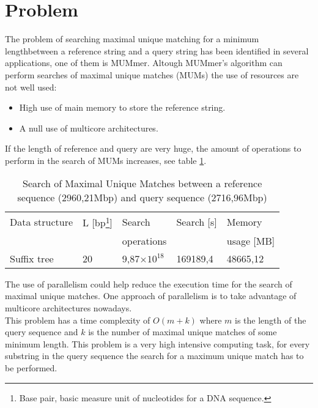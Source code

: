 \documentclass[3p,times]{elsarticle}
\providecommand{\e}[1]{\ensuremath{\times 10^{#1}}}
\begin{document}

\section{Problem}
\label{}
The problem of searching maximal unique matching for a minimum lengthbetween a reference
string and a query string has been
identified in several applications, one of them is MUMmer. Altough
MUMmer's algorithm can perform searches of maximal unique matches (MUMs)
the use of resources are not well used:
\begin{itemize}
  \item High use of main memory to store the reference string.
  \item A null use of multicore architectures.
\end{itemize}
If the length of reference and query are very huge, the amount of operations to perform
in the search of MUMs increases, see table \ref{tbl:operations}.
\begin{table}[ h!]
  \begin{small}
    \begin{center}
      \begin{tabular}{lllll}
        Data structure & L [bp\footnote{Base pair, basic measure unit of nucleotides for a DNA sequence.}] & Search  & Search [s] & Memory\\
        & & operations & & usage [MB]\\
        \hline
        Suffix tree & 20 & 9,87\e{18}  & 169189,4 & 48665,12\\
        \hline
      \end{tabular}
    \end{center}
  \end{small}
  \caption{Search of Maximal Unique Matches between a reference sequence (2960,21Mbp) and query sequence (2716,96Mbp)}
  \label{tbl:operations}
\end{table}
The use of parallelism could help reduce the execution time for the search of maximal unique matches. One approach of
parallelism is to take advantage of multicore architectures nowadays.\\
This problem has a time complexity of $O(m+k)$ where $m$ is the length of the query sequence and $k$ is the number of 
maximal unique matches of some minimum length. This problem is a very high intensive computing task, for every substring
in the query sequence the search for a maximum unique match has to be performed.\\
\end{document}
